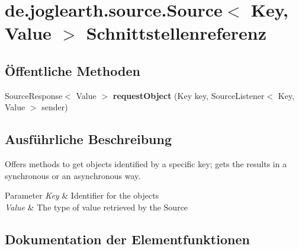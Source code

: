 \section{de.\-joglearth.\-source.\-Source$<$ Key, Value $>$ Schnittstellenreferenz}
\label{interfacede_1_1joglearth_1_1source_1_1_source_3_01_key_00_01_value_01_4}
\subsection*{Öffentliche Methoden}
\begin{DoxyCompactItemize}
\item 
Source\-Response$<$ Value $>$ {\bf request\-Object} (Key key, Source\-Listener$<$ Key, Value $>$ sender)
\end{DoxyCompactItemize}


\subsection{Ausführliche Beschreibung}
Offers methods to get objects identified by a specific key; gets the results in a synchronous or an asynchronous way.


\begin{DoxyParams}{Parameter}
{\em Key} & Identifier for the objects \\
\hline
{\em Value} & The type of value retrieved by the Source \\
\hline
\end{DoxyParams}


\subsection{Dokumentation der Elementfunktionen}
